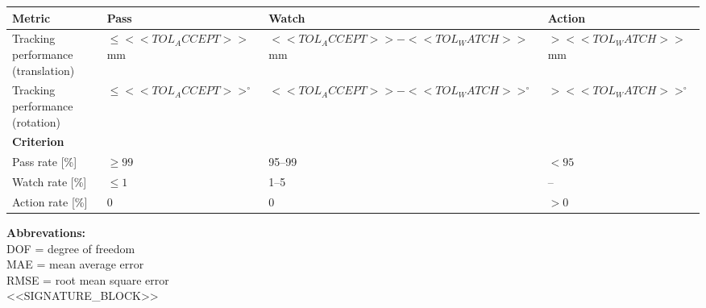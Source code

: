 \begin{tabularx}{\linewidth}{@{}X l l l@{}}
\toprule
\textbf{Metric} & \textbf{Pass} & \textbf{Watch} & \textbf{Action} \\
\midrule
\textcolor{extdlabel}{Tracking performance (translation)} &
$\leq <<TOL_ACCEPT>>$ mm &
$<<TOL_ACCEPT>> - <<TOL_WATCH>> $ mm &
$> <<TOL_WATCH>>$ mm \\
\textcolor{extdlabel}{Tracking performance (rotation)} &
$\leq <<TOL_ACCEPT>>^\circ$ &
$<<TOL_ACCEPT>> - <<TOL_WATCH>>  ^\circ$ &
$> <<TOL_WATCH>> ^\circ$ \\
\midrule
\textbf{Criterion} &  &  &  \\
\midrule
\textcolor{extdlabel}{Pass rate [\%]} &
$\geq 99$ &
95--99 &
$<95$ \\
\textcolor{extdlabel}{Watch rate [\%]} &
$\leq 1$ &
1--5 &
-- \\
\textcolor{extdlabel}{Action rate [\%]} &
0 &
0 &
$>0$ \\
\bottomrule
\end{tabularx}

\vspace{5mm}

\noindent
\textbf{Abbrevations:} \\
DOF = degree of freedom \\
MAE = mean average error \\
RMSE = root mean square error \\

<<SIGNATURE_BLOCK>>

\clearpage
